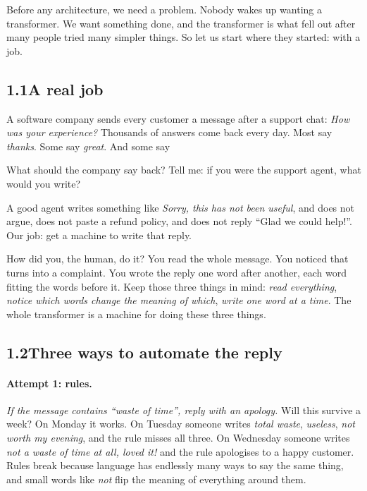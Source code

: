 Before any architecture, we need a problem. Nobody wakes up wanting a transformer. We want something done,
and the transformer is what fell out after many people tried many simpler things. So let us start where they
started: with a job.

\subsection*{1.1\quad A real job}

A software company sends every customer a message after a support chat: \emph{How was your experience?}
Thousands of answers come back every day. Most say \emph{thanks}. Some say \emph{great}. And some say
\begin{center}\end{center}
What should the company say back? Tell me: if you were the support agent, what would you write?

A good agent writes something like \emph{Sorry, this has not been useful}, and does not argue, does not paste a
refund policy, and does not reply ``Glad we could help!''. Our job: get a machine to write that reply.

How did you, the human, do it? You read the whole message. You noticed that  turns  into a
complaint. You wrote the reply one word after another, each word fitting the words before it. Keep those three
things in mind: \emph{read everything}, \emph{notice which words change the meaning of which}, \emph{write one
word at a time}. The whole transformer is a machine for doing these three things.


\subsection*{1.2\quad Three ways to automate the reply}

\paragraph{Attempt 1: rules.} \emph{If the message contains ``waste of time'', reply with an apology.}
Will this survive a week? On Monday it works. On Tuesday someone writes \emph{total waste}, \emph{useless},
\emph{not worth my evening}, and the rule misses all three. On Wednesday someone writes \emph{not a waste of
time at all, loved it!} and the rule apologises to a happy customer. Rules break because language has endlessly
many ways to say the same thing, and small words like \emph{not} flip the meaning of everything around them.

